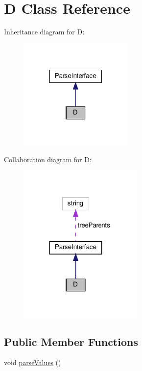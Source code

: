 \hypertarget{classD}{}\section{D Class Reference}
\label{classD}


Inheritance diagram for D\+:
\nopagebreak
\begin{figure}[H]
\begin{center}
\leavevmode
\includegraphics[width=160pt]{classD__inherit__graph}
\end{center}
\end{figure}


Collaboration diagram for D\+:
\nopagebreak
\begin{figure}[H]
\begin{center}
\leavevmode
\includegraphics[width=174pt]{classD__coll__graph}
\end{center}
\end{figure}
\subsection*{Public Member Functions}
\begin{DoxyCompactItemize}
\item 
void \hyperlink{classD_afd52a3aa7a7e9047386deb6aeb796b2a}{parse\+Values} ()
\end{DoxyCompactItemize}
